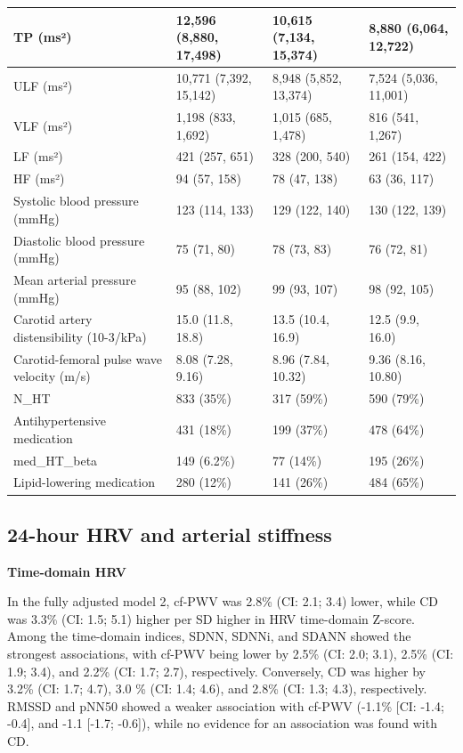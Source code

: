 \documentclass[
  a4paper,
  headsepline=true,
  open=any]{scrbook}
\begin{document}
\begin{table}
{\begin{tabular}{l|l|l|l}
\hline
TP (ms²) & 12,596 (8,880, 17,498) & 10,615 (7,134, 15,374) & 8,880 (6,064, 12,722)\\
\hline
ULF (ms²) & 10,771 (7,392, 15,142) & 8,948 (5,852, 13,374) & 7,524 (5,036, 11,001)\\
\hline
VLF (ms²) & 1,198 (833, 1,692) & 1,015 (685, 1,478) & 816 (541, 1,267)\\
\hline
LF (ms²) & 421 (257, 651) & 328 (200, 540) & 261 (154, 422)\\
\hline
HF (ms²) & 94 (57, 158) & 78 (47, 138) & 63 (36, 117)\\
\hline
Systolic blood pressure (mmHg) & 123 (114, 133) & 129 (122, 140) & 130 (122, 139)\\
\hline
Diastolic blood pressure (mmHg) & 75 (71, 80) & 78 (73, 83) & 76 (72, 81)\\
\hline
Mean arterial pressure (mmHg) & 95 (88, 102) & 99 (93, 107) & 98 (92, 105)\\
\hline
Carotid artery distensibility (10-3/kPa) & 15.0 (11.8, 18.8) & 13.5 (10.4, 16.9) & 12.5 (9.9, 16.0)\\
\hline
Carotid-femoral pulse wave velocity (m/s) & 8.08 (7.28, 9.16) & 8.96 (7.84, 10.32) & 9.36 (8.16, 10.80)\\
\hline
N\_HT & 833 (35\%) & 317 (59\%) & 590 (79\%)\\
\hline
Antihypertensive medication & 431 (18\%) & 199 (37\%) & 478 (64\%)\\
\hline
med\_HT\_beta & 149 (6.2\%) & 77 (14\%) & 195 (26\%)\\
\hline
Lipid-lowering medication & 280 (12\%) & 141 (26\%) & 484 (65\%)\\
\hline
\end{tabular}}
\end{table}

\hypertarget{hour-hrv-and-arterial-stiffness}{%
\subsection{24-hour HRV and arterial
stiffness}\label{hour-hrv-and-arterial-stiffness}}

\textbf{Time-domain HRV}

In the fully adjusted model 2, cf-PWV was 2.8\% (CI: 2.1; 3.4) lower,
while CD was 3.3\% (CI: 1.5; 5.1) higher per SD higher in HRV
time-domain Z-score. Among the time-domain indices, SDNN, SDNNi, and
SDANN showed the strongest associations, with cf-PWV being lower by
2.5\% (CI: 2.0; 3.1), 2.5\% (CI: 1.9; 3.4), and 2.2\% (CI: 1.7; 2.7),
respectively. Conversely, CD was higher by 3.2\% (CI: 1.7; 4.7), 3.0 \%
(CI: 1.4; 4.6), and 2.8\% (CI: 1.3; 4.3), respectively. RMSSD and pNN50
showed a weaker association with cf-PWV (-1.1\% {[}CI: -1.4; -0.4{]},
and -1.1 {[}-1.7; -0.6{]}), while no evidence for an association was
found with CD.
\end{document}
